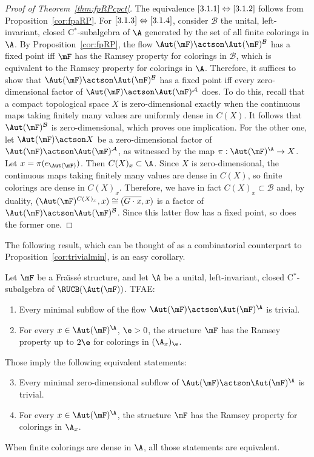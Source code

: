 \begin{proof}[Proof of Theorem~\ref{thm:fpRPcpct}]
The equivalence $\eqref{3.1.1}\Leftrightarrow \eqref{3.1.2}$ follows from Proposition~\ref{cor:fpaRP}. For $\eqref{3.1.3}\Leftrightarrow \eqref{3.1.4}$, consider $\mathcal B$ the unital, left-invariant, closed C$^{*}$-subalgebra of $\A$ generated by the set of all finite colorings in $\A$. By Proposition~\ref{cor:fpRP}, the flow $\Aut(\mF)\actson \Aut(\mF)^{\mathcal B}$ has a fixed point iff $\mF$ has the Ramsey property for colorings in $\mathcal B$, which is equivalent to the Ramsey property for colorings in $\A$. Therefore, it suffices to show that $\Aut(\mF)\actson \Aut(\mF)^{\mathcal B}$ has a fixed point iff every zero-dimensional factor of $\Aut(\mF)\actson \Aut(\mF)^{\mathcal A}$ does. To do this, recall that a compact topological space $X$ is zero-dimensional exactly when the continuous maps taking finitely many values are uniformly dense in $C(X)$. It follows that $\Aut(\mF)^{\mathcal B}$ is zero-dimensional, which proves one implication. For the other one, let $\Aut(\mF)\actson X$ be a zero-dimensional factor of $\Aut(\mF)\actson \Aut(\mF)^{\mathcal A}$, as witnessed by the map $\pi : \Aut(\mF)^{\A}\rightarrow X$. Let $x=\pi(e_{\Aut(\mF)})$. Then $C(X)_{x}\subset \A$. Since $X$ is zero-dimensional, the continuous maps taking finitely many values are dense in $C(X)$, so finite colorings are dense in $C(X)_{x}$. Therefore, we have in fact $C(X)_{x}\subset \mathcal B$ and, by duality, $(\Aut(\mF)^{C(X)_{x}},x)\cong (\overline{G\cdot x}, x)$ is a factor of $\Aut(\mF)\actson \Aut(\mF)^{\mathcal B}$. Since this latter flow has a fixed point, so does the former one.
\end{proof}

The following result, which can be thought of as a combinatorial counterpart to Proposition~\ref{cor:trivialmin}, is an easy corollary.

\begin{coro}\label{cor:fpRP'}
Let $\mF$ be a Fra\"{\i}ss\'e structure, and let $\A$ be a unital, left-invariant, closed C$^{*}$-subalgebra of $\RUCB(\Aut(\mF))$. TFAE:
\begin{enumerate}
\item \label{3.8.1} Every minimal subflow of the flow $\Aut(\mF)\actson \Aut(\mF)^{\A}$ is trivial.
\item \label{3.8.2} For every $x\in \Aut(\mF)^{\A}$, $\e>0$, the structure $\mF$ has the Ramsey property up to $2\e$ for colorings in $(\A_{x})_{\e}$.
\end{enumerate}

Those imply the following equivalent statements:
\begin{enumerate}
\setcounter{enumi}{2}
\item \label{3.8.3} Every minimal zero-dimensional subflow of $\Aut(\mF)\actson \Aut(\mF)^{\A}$ is trivial.
\item \label{3.8.4} For every $x\in \Aut(\mF)^{\A}$, the structure $\mF$ has the Ramsey property for colorings in $\A_{x}$.
\end{enumerate}

When finite colorings are dense in $\A$, all those statements are equivalent.
\end{coro}

